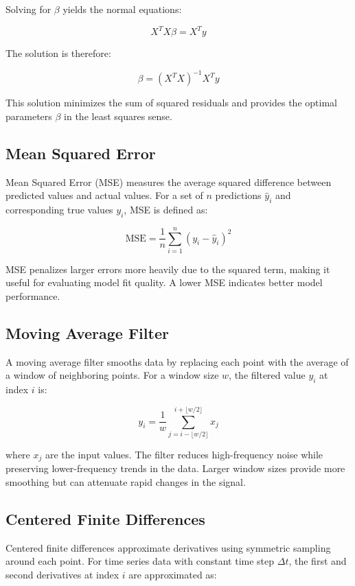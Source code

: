 Solving for \(\beta\) yields the normal equations:

\begin{equation}
\label{eq:normal_equations}
X^TX\beta = X^Ty
\end{equation}

The solution is therefore:

\begin{equation}
\label{eq:least_squares_solution}
\beta = (X^TX)^{-1}X^Ty
\end{equation}

This solution minimizes the sum of squared residuals and provides the optimal parameters \(\beta\) in the least squares sense.

\subsection{Mean Squared Error}
Mean Squared Error (MSE) measures the average squared difference between predicted values and actual values. For a set of \(n\) predictions \(\hat{y}_i\) and corresponding true values \(y_i\), MSE is defined as:

\begin{equation}
\label{eq:mse}
\text{MSE} = \frac{1}{n}\sum_{i=1}^n (y_i - \hat{y}_i)^2
\end{equation}

MSE penalizes larger errors more heavily due to the squared term, making it useful for evaluating model fit quality. A lower MSE indicates better model performance.


\subsection{Moving Average Filter}
A moving average filter smooths data by replacing each point with the average of a window of neighboring points. For a window size \(w\), the filtered value \(y_i\) at index \(i\) is:

\begin{equation}
\label{eq:moving_average}
y_i = \frac{1}{w}\sum_{j=i-\lfloor w/2 \rfloor}^{i+\lfloor w/2 \rfloor} x_j
\end{equation}

where \(x_j\) are the input values. The filter reduces high-frequency noise while preserving lower-frequency trends in the data. Larger window sizes provide more smoothing but can attenuate rapid changes in the signal.

\subsection{Centered Finite Differences}
Centered finite differences approximate derivatives using symmetric sampling around each point. For time series data with constant time step \(\Delta t\), the first and second derivatives at index \(i\) are approximated as:

